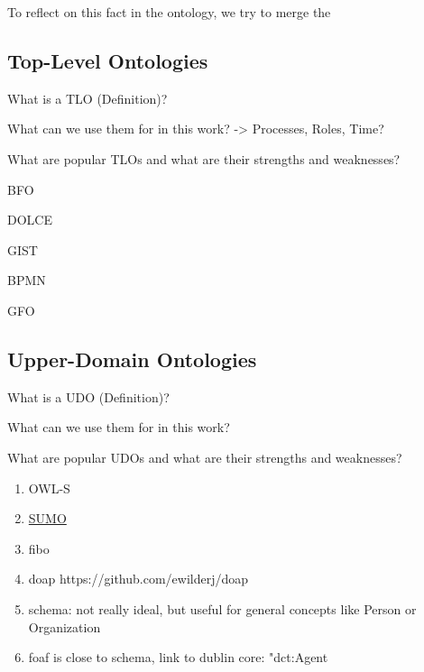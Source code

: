 \documentclass[a4paper, DIV=13, BCOR=0cm]{scrbook}
\begin{document}
To reflect on this fact in the ontology, we try to merge the
\subsection{Top-Level Ontologies }
\begin{compactenum}
	\item What is a TLO (Definition)?
	\item What can we use them for in this work? -> Processes, Roles, Time?
	\item What are popular TLOs and what are their strengths and weaknesses?
	\begin{compactenum}
		\item BFO %
		\item DOLCE
		\item GIST
		\item BPMN  \cite{2014foisbpmn}
		\item GFO
	\end{compactenum}
\end{compactenum}

\subsection{Upper-Domain Ontologies}
\begin{compactenum}
	\item What is a UDO (Definition)?
	\item What can we use them for in this work?
	\item What are popular UDOs and what are their strengths and weaknesses?
	\begin{enumerate}
		\item OWL-S
		\item \href{https://en.wikipedia.org/wiki/Suggested_Upper_Merged_Ontology}{SUMO}
		\item \gls{fibo}
		\item \gls{doap} https://github.com/ewilderj/doap
		\item \gls{schema}: not really ideal, but useful for general concepts like Person or Organization
		\item \gls{foaf} is close to schema, link to dublin core: "dct:Agent
	\end{enumerate}
\end{compactenum}
\end{document}

